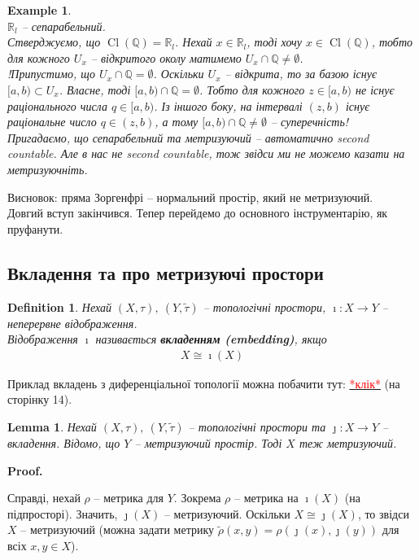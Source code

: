 \documentclass[a4paper, 10pt]{article}
\makeatletter
\theoremstyle{theoremdd}
\newtheorem{definition}[theorem]{Definition}
\newtheorem{example}[theorem]{Example}
\newtheorem{lemma}[theorem]{Lemma}
\DeclareMathOperator{\Cl}{Cl}
\renewenvironment{proof}[1][Proof.\\]{\par
\pushQED{\hfill \qed}%
\normalfont \topsep6\p@\@plus6\p@\relax
\trivlist
\item\relax
{\bfseries
#1\@addpunct{.}}\hspace\labelsep\ignorespaces
}{%
\popQED\endtrivlist\@endpefalse
}
\makeatother
\begin{document}
\begin{example}
\bigskip \\
\textit{$\mathbb{R}_l$ -- сепарабельний}.\\
Стверджуємо, що $\Cl(\mathbb{Q}) = \mathbb{R}_l$. Нехай $x \in \mathbb{R}_l$, тоді хочу $x \in \Cl(\mathbb{Q})$, тобто для кожного $U_x$ -- відкритого околу матимемо $U_x \cap \mathbb{Q} \neq \emptyset$.\\
!Припустимо, що $U_x \cap \mathbb{Q} = \emptyset$.  Оскільки $U_x$ -- відкрита, то за базою існує $[a,b) \subset U_x$. Власне, тоді $[a,b) \cap \mathbb{Q} = \emptyset$. Тобто для кожного $z \in [a,b)$ не існує раціонального числа $q \in [a,b)$. Із іншого боку, на інтервалі $(z,b)$ існує раціональне число $q \in (z,b)$, а тому $[a,b) \cap \mathbb{Q} \neq \emptyset$ -- суперечність!
\bigskip \\
Пригадаємо, що сепарабельний та метризуючий -- автоматично second countable. Але в нас не second countable, тож звідси ми не можемо казати на метризуючніть.
\end{example}
\noindent
Висновок: пряма Зоргенфрі -- нормальний простір, який не метризуючий.\\
Довгий вступ закінчився. Тепер перейдемо до основного інструментарію, як пруфанути.

\subsection{Вкладення та про метризуючі простори}
\begin{definition}
Нехай $(X,\tau),\ (Y,\tilde{\tau})$ -- топологічні простори, $\imath \colon X \to Y$ -- неперервне відображення.\\
Відображення $\imath$ називається \textbf{вкладенням (embedding)}, якщо
\begin{align*}
X \cong \imath(X)
\end{align*}
\end{definition}
\noindent
Приклад вкладень з диференціальної топології можна побачити тут: \href{http://www.astro.yale.edu/vdbosch/astro610_lecture2.pdf}{\textcolor{red}{*клік*}} (на сторінку 14).

\begin{lemma}
Нехай $(X,\tau),\ (Y,\tilde{\tau})$ -- топологічні простори та $\jmath \colon X \to Y$ -- вкладення. Відомо, що $Y$ -- метризуючий простір. Тоді $X$ теж метризуючий.
\end{lemma}

\begin{proof}
Справді, нехай $\rho$ -- метрика для $Y$. Зокрема $\rho$ -- метрика на $\imath(X)$ (на підпросторі). Значить, $\jmath(X)$ -- метризуючий. Оскільки $X \cong \jmath(X)$, то звідси $X$ -- метризуючий (можна задати метрику $\tilde{\rho}(x,y) = \rho(\jmath(x),\jmath(y))$ для всіх $x,y \in X$).
\end{proof}
\end{document}

